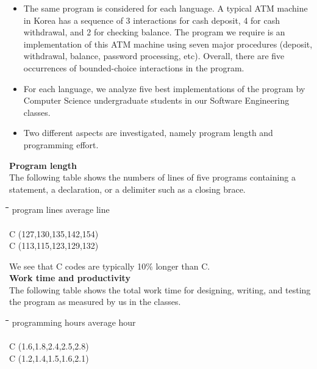 \documentclass[letter]{ieice}
\newenvironment{exmple}{
 \begingroup \begin{tabbing} \hspace{2em}\= \hspace{3em}\= \hspace{3em}\=
\hspace{3em}\= \hspace{3em}\= \hspace{3em}\= \kill}{
 \end{tabbing}\endgroup}
\newcommand{\muprolog}{{C}}
\begin{document}
\begin{itemize}
                                  
\item The same program  is considered for each language.   
 A typical ATM machine in Korea 
   has  a sequence of 3 interactions  for
cash deposit, 4 for cash withdrawal, and 2 for checking balance.
The program we require is an implementation of this ATM machine using seven
major procedures (deposit, withdrawal, balance, password processing, etc).
Overall, there are five occurrences of bounded-choice interactions in the program.


 \item
 For each language, we analyze five best implementations  of the 
program by 
Computer Science undergraduate students
in our Software Engineering classes.
                                                            

\item Two different aspects are investigated, namely program length and programming effort.

\end{itemize}


{\bf Program length} \\

The following table  shows the numbers of lines of five programs containing 
 a statement, a declaration, or  a delimiter such as a closing brace.

\begin{exmple}
 \>\>          program lines   \>\>\>\>  average line   \\ \\
C   \>\>        (127,130,135,142,154)    \>\>\> \\
\muprolog   \>\>        (113,115,123,129,132)    \>\>\> \\
\end{exmple}

    We see that C codes are typically 10\% longer   
than  \muprolog. \\


{\bf Work time and productivity} \\

                                                                       
The following table shows the total work time  for designing, writing, 
and testing the program as  measured by us in the classes.

\begin{exmple}
 \>\>          programming hours  \>\>\>\>  average hour   \\ \\
C   \>\>        (1.6,1.8,2.4,2.5,2.8)    \>\>\> \\
\muprolog   \>\>        (1.2,1.4,1.5,1.6,2.1)    \>\>\> \\
\end{exmple}
\end{document}
